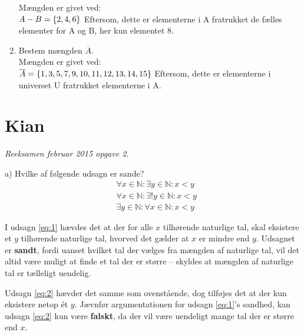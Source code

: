 \documentclass[12pt, a4paper]{article}
\begin{document}
\begin{enumerate}[label=\alph*)]
{		Mængden er givet ved:\\
        \begin{math}
            A - B = \{2, 4, 6\}\\
        \end{math}
            Eftersom, dette er elementerne i A fratrukket de fælles elementer for A og B, her kun elementet 8.
    }
    \item {
            Bestem mængden \begin{math} \overline{A} \end{math}.\\
		Mængden er givet ved:\\
        \begin{math}
            \overline{A} = \{1, 3, 5, 7, 9, 10, 11, 12, 13, 14, 15\}\\
        \end{math}
            Eftersom, dette er elementerne i universet U fratrukket elementerne i A.
    }          
\end{enumerate}

\newpage
\section{Kian}\vspace{-5pt}
\textit{Reeksamen februar 2015 opgave 2.}
\begin{tcolorbox}
a) Hvilke af følgende udsagn er sande?
\begin{align}
	&\forall x \in \mathbb{N} \! : \exists y \in \mathbb{N} \! : x < y		\label{eq:1}\\
	&\forall x \in \mathbb{N} \! : \exists !y \in \mathbb{N} \! : x < y		\label{eq:2}\\
	&\exists y \in \mathbb{N} \! : \forall x \in \mathbb{N} \! : x < y		\label{eq:3}
\end{align}
\end{tcolorbox}\vspace{-5pt}
I udsagn \eqref{eq:1} hævdes det at der for alle \(x\) tilhørende naturlige tal, skal eksistere et \(y\) tilhørende naturlige tal, hvorved det gælder at \(x\) er mindre end \(y\). Udsagnet er \textbf{sandt}, fordi uanset hvilket tal der vælges fra mængden af naturlige tal, vil det altid være muligt at finde et tal der er større -- skyldes at mængden af naturlige tal er tælleligt uendelig.

Udsagn \eqref{eq:2} hævder det samme som ovenstående, dog tilføjes det at der kun eksistere netop ét \(y\). Jævnfør argumentationen for udsagn \eqref{eq:1}'s sandhed, kan udsagn \eqref{eq:2} kun være \textbf{falskt}, da der vil være uendeligt mange tal der er større end \(x\).
\end{document}
